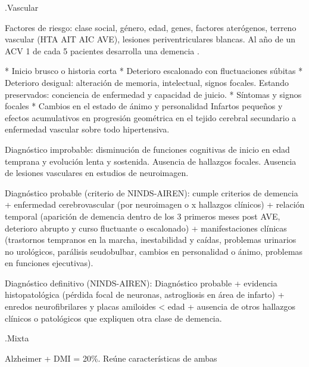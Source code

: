 \documentclass{scrbook}
\begin{document}
.Vascular

Factores de riesgo: clase social, género, edad, genes, factores aterógenos, terreno vascular (HTA AIT AIC AVE), lesiones periventriculares blancas. Al año de un ACV 1 de cada 5 pacientes desarrolla una demencia \cite{craig2022prevalence}.

* Inicio brusco o historia corta
* Deterioro escalonado con fluctuaciones súbitas
* Deterioro desigual: alteración de memoria, intelectual, signos focales. Estando preservados: conciencia de enfermedad y capacidad de juicio.
* Síntomas y signos focales
* Cambios en el estado de ánimo y personalidad Infartos pequeños y efectos acumulativos en progresión geométrica en el tejido cerebral secundario a enfermedad vascular sobre todo hipertensiva.

Diagnóstico improbable: disminución de funciones cognitivas de inicio en edad temprana y evolución lenta y sostenida. Ausencia de hallazgos focales. Ausencia de lesiones vasculares en estudios de neuroimagen.

Diagnóstico probable (criterio de NINDS-AIREN): cumple criterios de demencia + enfermedad cerebrovascular (por neuroimagen o x hallazgos clínicos) + relación temporal (aparición de demencia dentro de los 3 primeros meses post AVE, deterioro abrupto y curso fluctuante o escalonado) + manifestaciones clínicas (trastornos tempranos en la marcha, inestabilidad y caídas, problemas urinarios no urológicos, parálisis seudobulbar, cambios en personalidad o ánimo, problemas en funciones ejecutivas).

Diagnóstico definitivo (NINDS-AIREN): Diagnóstico probable + evidencia histopatológica (pérdida focal de neuronas, astrogliosis en área de infarto) + enredos neurofibrilares y placas amiloides < edad + ausencia de otros hallazgos clínicos o patológicos que expliquen otra clase de demencia.

.Mixta

Alzheimer + DMI = 20\%. Reúne características de ambas
\end{document}
